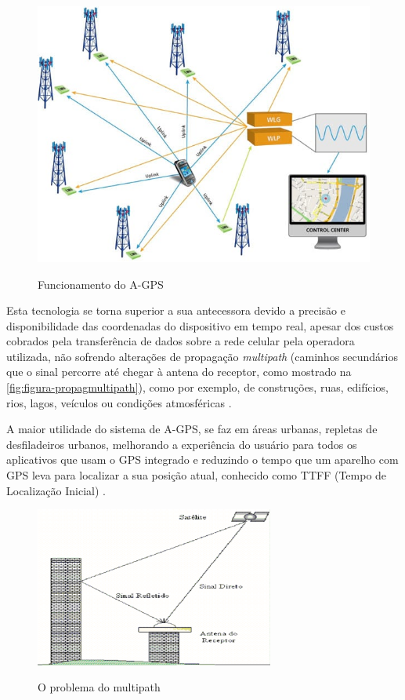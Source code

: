 \begin{figure}[H]
    \centering
    \caption{Funcionamento do A-GPS}
    \includegraphics[width=1.0\textwidth]{./dados/figuras/fig2}
    \label{fig:figura-funcagps}
\end{figure}

Esta tecnologia se torna superior a sua antecessora devido a precisão e disponibilidade das coordenadas do dispositivo em tempo real, apesar dos custos cobrados pela transferência de dados sobre a rede celular pela operadora utilizada, não sofrendo alterações de propagação \textit{multipath} (caminhos secundários que o sinal percorre até chegar à antena do receptor, como mostrado na \autoref{fig:figura-propagmultipath}), como por exemplo, de construções, ruas, edifícios, rios, lagos, veículos ou condições atmosféricas \cite{oficinanetagps:2018} \cite{multicaminho:2004}.

 A maior utilidade do sistema de A-GPS, se faz em áreas urbanas, repletas de desfiladeiros urbanos, melhorando a experiência do usuário para todos os aplicativos que usam o GPS integrado e reduzindo o tempo que um aparelho com GPS leva para localizar a sua posição atual, conhecido como TTFF (Tempo de Localização Inicial) \cite{oficinanetagps:2018}.

\begin{figure}[H]
    \centering
    \caption{O problema do multipath}
    \includegraphics[width=0.7\textwidth]{./dados/figuras/fig3}
    \label{fig:figura-propagmultipath}
\end{figure}

